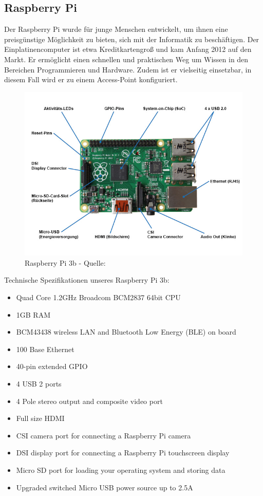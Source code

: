 \documentclass[a4paper,11pt,singlespacing]{article}
\begin{document}
    		\subsection{Raspberry Pi}
    			Der Raspberry Pi wurde für junge Menschen entwickelt, um ihnen eine preisgünstige Möglichkeit zu bieten, sich mit der Informatik zu beschäftigen. Der Einplatinencomputer ist etwa Kreditkartengroß und kam Anfang 2012 auf den Markt. Er ermöglicht einen schnellen und praktischen Weg um Wissen in den Bereichen Programmieren und Hardware. Zudem ist er vielseitig einsetzbar, in diesem Fall wird er zu einem Access-Point konfiguriert. 
    			\begin{figure}[ht]
    				\centering
	    			\includegraphics[scale=0.5]{raspberry_pi_3b}
	    				\caption{Raspberry Pi 3b - Quelle: \cite{Picture_Raspberrypi3b} }
	    				\label{raspberrypi3b}
				\end{figure}
				Technische Spezifikationen unseres Raspberry Pi 3b:
				\begin{itemize}
					\item Quad Core 1.2GHz Broadcom BCM2837 64bit CPU
					\item 1GB RAM
					\item BCM43438 wireless LAN and Bluetooth Low Energy (BLE) on board
					\item 100 Base Ethernet
					\item 40-pin extended GPIO
					\item 4 USB 2 ports
					\item 4 Pole stereo output and composite video port
					\item Full size HDMI
					\item CSI camera port for connecting a Raspberry Pi camera
					\item DSI display port for connecting a Raspberry Pi touchscreen display
					\item Micro SD port for loading your operating system and storing data
					\item Upgraded switched Micro USB power source up to 2.5A
				\end{itemize}
\end{document}
